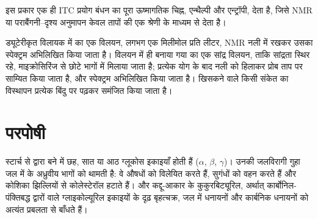 इस प्रकार एक ही ITC प्रयोग बंधन का पूरा ऊष्मागतिक चिह्न, एन्थैल्पी और एन्ट्रॉपी,
देता है, जिसे NMR या पराबैंगनी--दृश्य अनुमापन केवल
तापों की एक श्रेणी के माध्यम से देता है।

\begin{inthelab}[एक NMR अनुमापन]
ड्यूटेरीकृत विलायक में  का एक विलयन, लगभग एक मिलीमोल प्रति लीटर,
NMR नली में रखकर उसका स्पेक्ट्रम अभिलिखित किया जाता है।  विलयन में ही बनाया गया
 का एक सांद्र विलयन, ताकि  सांद्रता स्थिर
रहे, माइक्रोसिरिंज से छोटे भागों में मिलाया जाता है; प्रत्येक योग के बाद
नली को हिलाकर प्रोब ताप पर साम्यित किया जाता है, और स्पेक्ट्रम
अभिलिखित किया जाता है। खिसकने वाले किसी  संकेत का विस्थापन प्रत्येक बिंदु पर पढ़कर
समंजित किया जाता है।
\end{inthelab}

\section{परपोषी}

स्टार्च से  द्वारा बने  में छह, सात या आठ ग्लूकोस
इकाइयाँ होती हैं ($\alpha$, $\beta$, $\gamma$)। उनकी जलविरागी गुहा जल में  के अध्रुवीय भागों को
थामती है: वे औषधों को विलेयित करते हैं, सुगंधों को वहन करते हैं और
कोशिका झिल्लियों से कोलेस्टेरॉल हटाते हैं।  और कद्दू-आकार के कुकुरबिट्यूरिल, अर्थात्
कार्बोनिल-पंक्तिबद्ध द्वारों वाले ग्लाइकोल्यूरिल इकाइयों के दृढ़
बृहत्चक्र, जल में धनायनों और कार्बनिक धनायनों को अत्यंत प्रबलता से बाँधते हैं।

